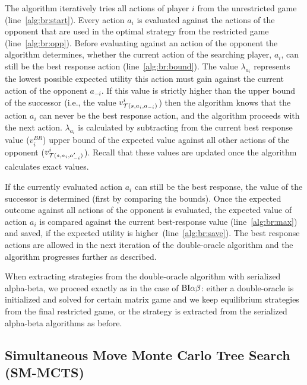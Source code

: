The algorithm iteratively tries all actions of player $i$ from the unrestricted game (line~\ref{alg:br:start}). 
Every action $a_i$ is evaluated against the actions of the opponent that are used in the optimal strategy from the restricted game (line~\ref{alg:br:opp}).
Before evaluating against an action of the opponent the algorithm determines, whether the current action of the searching player, $a_i$, can still be the best response action (line~\ref{alg:br:bound}). 
The value $\lambda_{a_i}$ represents the lowest possible expected utility this action must gain against the current action of the opponent $a_{-i}$. 
If this value is strictly higher than the upper bound of the successor (i.e., the value $v^i_{\mathcal{T}(s,a_i,a_{-i})}$) then the algorithm knows that the action $a_i$ can never be the best response action, and the algorithm proceeds with the next action.
$\lambda_{a_i}$ is calculated by subtracting from the current best response value ($v_i^{BR}$) upper bound of the expected value against all other actions of the opponent ($v^i_{\mathcal{T}(s,a_i,a'_{-i})}$). Recall that these values are updated once the algorithm calculates exact values.

If the currently evaluated action $a_i$ can still be the best response, the value of the successor is determined (first by comparing the bounds). Once the expected outcome against all actions of the opponent is evaluated, the expected value of action $a_i$ is compared against the current best-response value (line~\ref{alg:br:max}) and saved, if the expected utility is higher~(line~\ref{alg:br:save}). The best response actions are allowed in the next iteration of the double-oracle algorithm and the algorithm progresses further as described.

When extracting strategies from the double-oracle algorithm with serialized alpha-beta, we proceed exactly as in the case of $\textrm{BI}\alpha\beta$: either a double-oracle is initialized and solved for certain matrix game and we keep equilibrium strategies from the final restricted game, or the strategy is extracted from the serialized alpha-beta algorithms as before.


\subsection{Simultaneous Move Monte Carlo Tree Search (SM-MCTS)} \label{sec:algs:smmcts}


